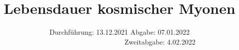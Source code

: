 
\setlength\parindent{0pt}
\subject{V01}
\title{Lebensdauer kosmischer Myonen}
\date{%
  Durchführung: 13.12.2021
  \hspace{3em}
  Abgabe: 07.01.2022 \\
  \textcolor{white}{Durchführung: 13.12.2021} \hspace{3em} Zweitabgabe: 4.02.2022
}


\maketitle
\thispagestyle{empty}
\tableofcontents
\newpage
{}







\newpage
\nocite{*}
\printbibliography
\appendix


